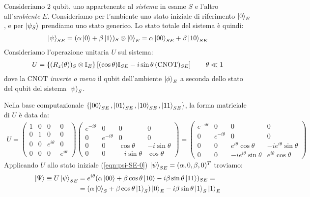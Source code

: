 \documentclass[../../InformazioneQuantistica.tex]{subfiles}
\begin{document}
Consideriamo $2$ qubit, uno appartenente al \textit{sistema} in esame $S$ e l'altro all'\textit{ambiente} $E$. Consideriamo per l'ambiente uno stato iniziale di riferimento $\Ket{0}_E$, e per $\Ket{\psi_S}$ prendiamo uno stato generico. Lo stato totale del sistema è quindi:
\begin{align}
\Ket{\psi}_{SE}=(\alpha \Ket{0}+\beta \Ket{1})_S \otimes \Ket{0}_E = \alpha \Ket{00}_{SE} + \beta \Ket{10}_{SE}
\label{eqn:psi-SE-0}
\end{align}
Consideriamo l'operazione unitaria $U$ sul sistema:
\begin{align*}
U=\left\{ (R_z(\theta))_S\otimes \mathbb{I}_E \right\} \left[(\cos\theta) \mathbb{I}_{SE} - i\sin\theta\,(\operatorname{CNOT})_{SE} \right] \qquad \theta \ll 1
\end{align*}
dove la CNOT \textit{inverte o meno} il qubit dell'ambiente $\Ket{\phi}_E$ a seconda dello stato del qubit del sistema $\Ket{\psi}_S$.


Nella base computazionale $\{\Ket{00}_{SE}, \Ket{01}_{SE}, \Ket{10}_{SE}, \Ket{11}_{SE}\}$, la forma matriciale di $U$ è data da:
\begin{align*}
U=\left(
\begin{array}{cc|cc}
1 & 0 & 0 & 0\\
0 & 1 & 0 & 0\\ \hline
0 & 0 & e^{i\theta} & 0\\
0 & 0 & 0 & e^{i\theta}
\end{array}
\right)
\left(
\begin{array}{cc|cc}
e^{-i\theta} & 0 & 0 & 0\\
0 & e^{-i\theta} & 0 & 0\\ \hline
0 & 0 & \cos\theta & -i\sin\theta\\
0 & 0 & -i\sin\theta & \cos\theta
\end{array}
\right)= \left(
\begin{array}{cc|cc}
e^{-i\theta} & 0 & 0 & 0\\
0 & e^{-i\theta} & 0 & 0\\ \hline
0 & 0 & e^{i\theta}\cos\theta & -i e^{i\theta}\sin\theta\\
0 & 0 & -i e^{i\theta}\sin\theta & e^{i\theta}\cos\theta
\end{array} \right)
\end{align*}
Applicando $U$ allo stato iniziale (\ref{eqn:psi-SE-0}) $\Ket{\psi}_{SE} = (\alpha, 0, \beta, 0)^T$ troviamo:
\begin{align*}
\Ket{\Psi} \equiv U\Ket{\psi}_{SE} &= e^{i\theta}(\alpha \Ket{00}+\beta \cos\theta \Ket{10}-i\beta \sin\theta \Ket{11})_{SE} = \\
&= \left(\alpha \Ket{0}_S + \beta \cos\theta \Ket{1}_S\right)\Ket{0}_E - i \beta \sin\theta \Ket{1}_S \Ket{1}_E
\end{align*}
\end{document}
